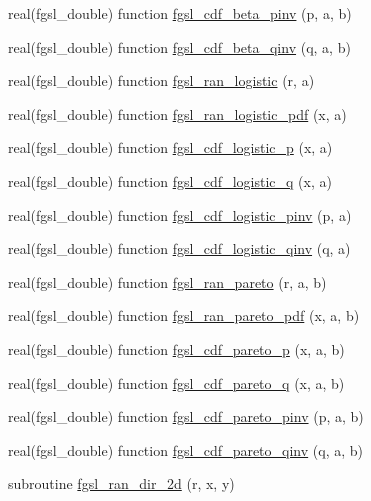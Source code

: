 \begin{DoxyCompactItemize}
\item 
real(fgsl\+\_\+double) function \hyperlink{rng_8finc_ad9f940388d86851d6a3fb67138f0cda9}{fgsl\+\_\+cdf\+\_\+beta\+\_\+pinv} (p, a, b)
\item 
real(fgsl\+\_\+double) function \hyperlink{rng_8finc_a0009c5b3be187def3e391ddf403e4a36}{fgsl\+\_\+cdf\+\_\+beta\+\_\+qinv} (q, a, b)
\item 
real(fgsl\+\_\+double) function \hyperlink{rng_8finc_afa24e40f001e4ef9cd8e3794447b9a80}{fgsl\+\_\+ran\+\_\+logistic} (r, a)
\item 
real(fgsl\+\_\+double) function \hyperlink{rng_8finc_a3d50904646cacac7540c7734e21a1590}{fgsl\+\_\+ran\+\_\+logistic\+\_\+pdf} (x, a)
\item 
real(fgsl\+\_\+double) function \hyperlink{rng_8finc_aa4001a113de807a07164d4516d756417}{fgsl\+\_\+cdf\+\_\+logistic\+\_\+p} (x, a)
\item 
real(fgsl\+\_\+double) function \hyperlink{rng_8finc_aa286aa32b87ba0c9df449bebcbfcd9f7}{fgsl\+\_\+cdf\+\_\+logistic\+\_\+q} (x, a)
\item 
real(fgsl\+\_\+double) function \hyperlink{rng_8finc_a6acf734873703cca27ee7f86519d42ee}{fgsl\+\_\+cdf\+\_\+logistic\+\_\+pinv} (p, a)
\item 
real(fgsl\+\_\+double) function \hyperlink{rng_8finc_a196052826f8d1b9e958a3732bc05e900}{fgsl\+\_\+cdf\+\_\+logistic\+\_\+qinv} (q, a)
\item 
real(fgsl\+\_\+double) function \hyperlink{rng_8finc_af630ea831bbec975f2b31e0a08aa5fb2}{fgsl\+\_\+ran\+\_\+pareto} (r, a, b)
\item 
real(fgsl\+\_\+double) function \hyperlink{rng_8finc_ae469b5eaa361c5c0e3b888fd3efc0bf3}{fgsl\+\_\+ran\+\_\+pareto\+\_\+pdf} (x, a, b)
\item 
real(fgsl\+\_\+double) function \hyperlink{rng_8finc_a4cdcd55585b860b72e948b1bd7e27461}{fgsl\+\_\+cdf\+\_\+pareto\+\_\+p} (x, a, b)
\item 
real(fgsl\+\_\+double) function \hyperlink{rng_8finc_a1199071cd8707413370f40d23d973108}{fgsl\+\_\+cdf\+\_\+pareto\+\_\+q} (x, a, b)
\item 
real(fgsl\+\_\+double) function \hyperlink{rng_8finc_afd1b3c0e697fb0f2f0935541cd05b804}{fgsl\+\_\+cdf\+\_\+pareto\+\_\+pinv} (p, a, b)
\item 
real(fgsl\+\_\+double) function \hyperlink{rng_8finc_a458ed89072db48fb5f4033bbb48fba61}{fgsl\+\_\+cdf\+\_\+pareto\+\_\+qinv} (q, a, b)
\item 
subroutine \hyperlink{rng_8finc_a80f718ba94b09ba5011351c5284c9743}{fgsl\+\_\+ran\+\_\+dir\+\_\+2d} (r, x, y)

\end{DoxyCompactItemize}
